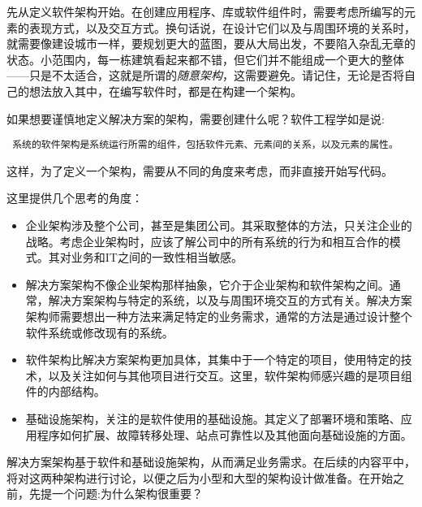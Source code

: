 先从定义软件架构开始。在创建应用程序、库或软件组件时，需要考虑所编写的元素的表现方式，以及交互方式。换句话说，在设计它们以及与周围环境的关系时，就需要像建设城市一样，要规划更大的蓝图，要从大局出发，不要陷入杂乱无章的状态。小范围内，每一栋建筑看起来都不错，但它们并不能组成一个更大的整体——只是不太适合，这就是所谓的\textit{随意架构}，这需要避免。请记住，无论是否将自己的想法放入其中，在编写软件时，都是在构建一个架构。

如果想要谨慎地定义解决方案的架构，需要创建什么呢？软件工程学如是说:

\begin{center}
\tt
系统的软件架构是系统运行所需的组件，包括软件元素、元素间的关系，以及元素的属性。
\end{center}

这样，为了定义一个架构，需要从不同的角度来考虑，而非直接开始写代码。


这里提供几个思考的角度：

\begin{itemize}
\item 
企业架构涉及整个公司，甚至是集团公司。其采取整体的方法，只关注企业的战略。考虑企业架构时，应该了解公司中的所有系统的行为和相互合作的模式。其对业务和IT之间的一致性相当敏感。

\item 
解决方案架构不像企业架构那样抽象，它介于企业架构和软件架构之间。通常，解决方案架构与特定的系统，以及与周围环境交互的方式有关。解决方案架构师需要想出一种方法来满足特定的业务需求，通常的方法是通过设计整个软件系统或修改现有的系统。

\item
软件架构比解决方案架构更加具体，其集中于一个特定的项目，使用特定的技术，以及关注如何与其他项目进行交互。这里，软件架构师感兴趣的是项目组件的内部结构。

\item
基础设施架构，关注的是软件使用的基础设施。其定义了部署环境和策略、应用程序如何扩展、故障转移处理、站点可靠性以及其他面向基础设施的方面。
\end{itemize}

解决方案架构基于软件和基础设施架构，从而满足业务需求。在后续的内容平中，将对这两种架构进行讨论，以便之后为小型和大型的架构设计做准备。在开始之前，先提一个问题:为什么架构很重要？













